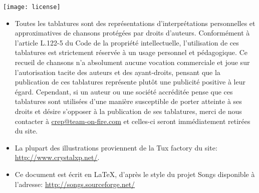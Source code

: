 \vspace{0.5cm}
\begin{center}
  \texttt{[image: license]}
\end{center}
\vspace{0.5cm}

\begin{itemize}
\item Toutes les tablatures sont des représentations d'interprétations
  personnelles et approximatives de chansons protégées par droits
  d'auteurs. Conformément à l'article L.122-5 du Code de la propriété
  intellectuelle, l'utilisation de ces tablatures est strictement
  réservée à un usage personnel et pédagogique. Ce recueil de chansons
  n'a absolument aucune vocation commerciale et joue sur
  l'autorisation tacite des auteurs et des ayant-droits, pensant que
  la publication de ces tablatures représente plutôt une publicité
  positive à leur égard. Cependant, si un auteur ou une société
  accréditée pense que ces tablatures sont utilisées d'une manière
  susceptible de porter atteinte à ses droits et désire s'opposer à la
  publication de ses tablatures, merci de nous contacter à
  \url{crep@team-on-fire.com} et celles-ci seront immédiatement
  retirées du site.
\item La plupart des illustrations proviennent de la Tux factory
  du site: \url{http://www.crystalxp.net/}.
\item Ce document est écrit en LaTeX, d'après le style du projet Songs
  disponible à l'adresse: \url{http://songs.sourceforge.net/}
\end{itemize}



